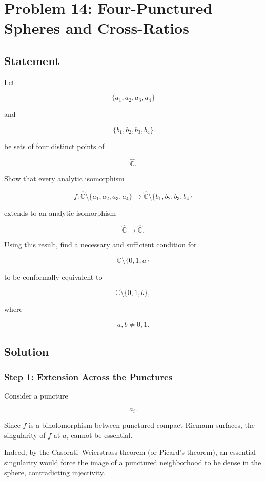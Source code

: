 \documentclass[12pt,a4paper]{article}
\theoremstyle{notespace}
\begin{document}
\bigskip

\section{Problem 14: Four-Punctured Spheres and Cross-Ratios}

\subsection*{Statement}

Let

\[
\{a_1,a_2,a_3,a_4\}
\]

and

\[
\{b_1,b_2,b_3,b_4\}
\]

be sets of four distinct points of

\[
\widehat{\mathbb C}.
\]

Show that every analytic isomorphism

\[
f:
\widehat{\mathbb C}
\setminus
\{a_1,a_2,a_3,a_4\}
\longrightarrow
\widehat{\mathbb C}
\setminus
\{b_1,b_2,b_3,b_4\}
\]

extends to an analytic isomorphism

\[
\widehat{\mathbb C}
\longrightarrow
\widehat{\mathbb C}.
\]

Using this result, find a necessary and sufficient condition for

\[
\mathbb C\setminus\{0,1,a\}
\]

to be conformally equivalent to

\[
\mathbb C\setminus\{0,1,b\},
\]

where

\[
a,b\neq0,1.
\]

\subsection*{Solution}

\subsubsection*{Step 1: Extension Across the Punctures}

Consider a puncture

\[
a_i.
\]

Since \(f\) is a biholomorphism between punctured compact Riemann surfaces, the singularity of \(f\) at \(a_i\) cannot be essential.

Indeed, by the Casorati--Weierstrass theorem (or Picard's theorem), an essential singularity would force the image of a punctured neighborhood to be dense in the sphere, contradicting injectivity.
\end{document}
